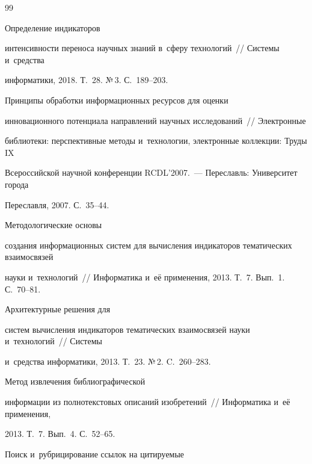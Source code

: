 {{\begin{thebibliography}{99}




Определение индикаторов 


интенсивности переноса научных знаний в~сферу технологий~/\!\!/ Системы и~средства 


информатики, 2018. Т.~28. №\,3. С.~189--203.







 Принципы обработки информационных ресурсов для оценки 


инновационного потенциала направлений научных исследований~/\!\!/ Электронные 


библиотеки: перспективные методы и~технологии, электронные коллекции: Труды IX 


Всероссийской научной конференции RCDL'2007.~--- Переславль: Университет города 


Переславля, 2007. С.~35--44.




 Методологические основы 


создания информационных систем для вычисления индикаторов тематических взаимосвязей 


науки и~технологий~/\!\!/ Информатика и~её применения, 2013. Т.~7. Вып.~1. С.~70--81.






 Архитектурные решения для 


систем вычисления индикаторов тематических взаимосвязей науки и~технологий~/\!\!/ Системы 


и~средства информатики, 2013. Т.~23. №\,2. C.~260--283.




 Метод извлечения библиографической 


информации из полнотекстовых описаний изобретений~/\!\!/ Информатика и~её применения, 


2013. Т.~7. Вып.~4. С.~52--65.




 Поиск и~рубрицирование ссылок на цитируемые 



\end{thebibliography}}}

